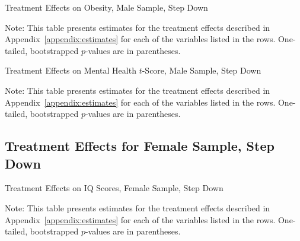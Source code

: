 	\begin{table}[H]
     \caption{Treatment Effects on Obesity, Male Sample, Step Down}
     \label{table:abccare_rslt_male_cat15_sd}
	
	\end{table} 
\begin{spacing}{1}
\begin{footnotesize}
\noindent Note: This table presents estimates for the treatment effects described in Appendix~\ref{appendix:estimates} for each of the variables listed in the rows.  One-tailed, bootstrapped $p$-values are in parentheses.
\end{footnotesize}
\end{spacing}

	\begin{table}[H]
     \caption{Treatment Effects on Mental Health $t$-Score, Male Sample, Step Down}
     \label{table:abccare_rslt_male_cat16_sd}
	
	\end{table} 
\begin{spacing}{1}
\begin{footnotesize}
\noindent Note: This table presents estimates for the treatment effects described in Appendix~\ref{appendix:estimates} for each of the variables listed in the rows.  One-tailed, bootstrapped $p$-values are in parentheses.
\end{footnotesize}
\end{spacing}






\subsection{Treatment Effects for Female Sample, Step Down}


	
	\begin{table}[H]
     \caption{Treatment Effects on IQ Scores, Female Sample, Step Down}
     \label{table:abccare_rslt_female_cat0_sd}
	
	\end{table}
\begin{spacing}{1}
\begin{footnotesize}
\noindent Note: This table presents estimates for the treatment effects described in Appendix~\ref{appendix:estimates} for each of the variables listed in the rows.  One-tailed, bootstrapped $p$-values are in parentheses.
\end{footnotesize}
\end{spacing}

